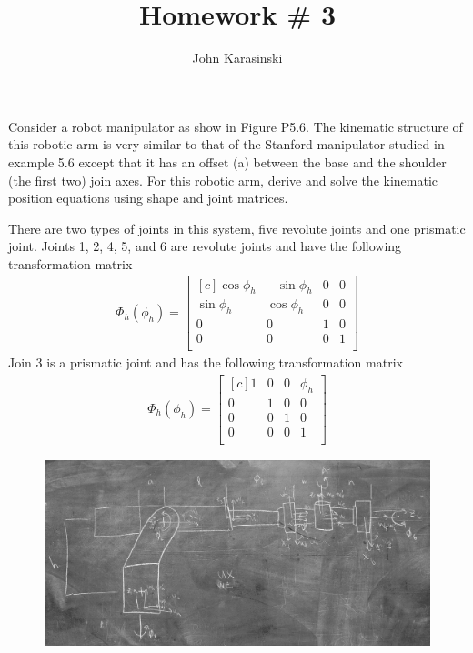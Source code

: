 \documentclass[onecolumn,10pt]{jhwhw}
\author{John Karasinski}
\title{Homework \# 3}
\begin{document}

\problem{}
Consider a robot manipulator as show in Figure P5.6. The kinematic structure of this robotic arm is very similar to that of the Stanford manipulator studied in example 5.6 except that it has an offset (a) between the base and the shoulder (the first two) join axes. For this robotic arm, derive and solve the kinematic position equations using shape and joint matrices.

There are two types of joints in this system, five revolute joints and one prismatic joint. Joints 1, 2, 4, 5, and 6 are revolute joints and have the following transformation matrix
\begin{align*}
\Phi_h (\phi_h) =
\begin{bmatrix*}[c]
\cos \phi_h & -\sin \phi_h & 0 & 0 \\
\sin \phi_h &  \cos \phi_h & 0 & 0 \\
          0 &            0 & 1 & 0 \\
          0 &            0 & 0 & 1 \\
\end{bmatrix*}
\end{align*}
Join 3 is a prismatic joint and has the following transformation matrix
\begin{align*}
\Phi_h (\phi_h) =
\begin{bmatrix*}[c]
          1 &            0 & 0 & \phi_h \\
          0 &            1 & 0 & 0 \\
          0 &            0 & 1 & 0 \\
          0 &            0 & 0 & 1 \\
\end{bmatrix*}
\end{align*}

\begin{figure}[h!]
  \centering
  \includegraphics[width=\linewidth]{homework3-diagram.jpg}
\end{figure}
\end{document}
